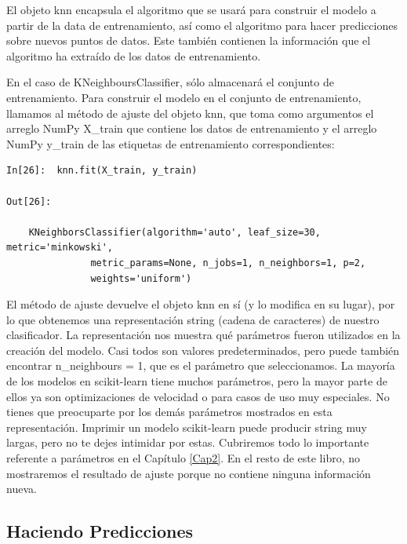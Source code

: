 
El objeto knn encapsula el algoritmo que se usará para construir el modelo a partir de
la data de entrenamiento, así como el algoritmo para hacer predicciones sobre nuevos puntos de datos. Este
también contienen la información que el algoritmo ha extraído de los datos de entrenamiento.
 
En el caso de {\ttfamily KNeighboursClassifier}, sólo almacenará el conjunto de entrenamiento.
Para construir el modelo en el conjunto de entrenamiento, llamamos al método de ajuste del objeto knn,
que toma como argumentos el arreglo {\ttfamily NumPy \: X\_train} que contiene los datos de entrenamiento y
el arreglo NumPy y\_train de las etiquetas de entrenamiento correspondientes: \\

\begin{lstlisting}
In[26]:  knn.fit(X_train, y_train)

Out[26]:

    KNeighborsClassifier(algorithm='auto', leaf_size=30, metric='minkowski',
               metric_params=None, n_jobs=1, n_neighbors=1, p=2,
               weights='uniform')
\end{lstlisting}


El método de ajuste devuelve el objeto knn en sí (y lo modifica en su lugar), por lo que obtenemos una representación string (cadena de caracteres) de nuestro clasificador. La representación nos muestra qué parámetros fueron utilizados en la creación del modelo. Casi todos son valores predeterminados, pero puede también encontrar {\ttfamily n\_neighbours = 1}, que es el parámetro que seleccionamos. La mayoría de los modelos en scikit-learn tiene muchos parámetros, pero la mayor parte de ellos ya son  optimizaciones de velocidad o para casos de uso muy especiales. No tienes que preocuparte por los demás parámetros mostrados en esta representación.   Imprimir un modelo scikit-learn puede producir string  muy largas, pero no te dejes intimidar por estas. Cubriremos todo lo importante referente a parámetros en el Capítulo \ref{Cap2}. En el resto de este libro, no mostraremos el resultado  de ajuste porque no contiene ninguna información nueva.\\

\subsection{Haciendo Predicciones}

